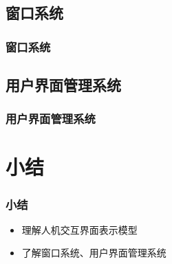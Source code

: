 \documentclass{beamer}
\begin{document}
\subsection{窗口系统}
\begin{frame}
	\frametitle{窗口系统}

\end{frame}

\subsection{用户界面管理系统}
\begin{frame}
	\frametitle{用户界面管理系统}

\end{frame}

\section{小结}
\begin{frame}
	\frametitle{小结}
	\begin{itemize}
		\item 理解人机交互界面表示模型
		\item 了解窗口系统、用户界面管理系统
	\end{itemize}
\end{frame}
\end{document}
